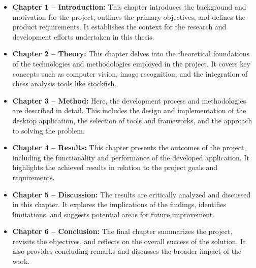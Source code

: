 \begin{itemize}
    \item \textbf{Chapter 1 -- Introduction:} This chapter introduces the background and motivation for the project, outlines the primary objectives, and defines the product requirements. It establishes the context for the research and development efforts undertaken in this thesis.
    
    \item \textbf{Chapter 2 -- Theory:} This chapter delves into the theoretical foundations of the technologies and methodologies employed in the project. It covers key concepts such as computer vision, image recognition, and the integration of chess analysis tools like \gls{stockfish}.
    
    \item \textbf{Chapter 3 -- Method:} Here, the development process and methodologies are described in detail. This includes the design and implementation of the desktop application, the selection of tools and frameworks, and the approach to solving the problem.
    
    \item \textbf{Chapter 4 -- Results:} This chapter presents the outcomes of the project, including the functionality and performance of the developed application. It highlights the achieved results in relation to the project goals and requirements.
    
    \item \textbf{Chapter 5 -- Discussion:} The results are critically analyzed and discussed in this chapter. It explores the implications of the findings, identifies limitations, and suggests potential areas for future improvement.
    
    \item \textbf{Chapter 6 -- Conclusion:} The final chapter summarizes the project, revisits the objectives, and reflects on the overall success of the solution. It also provides concluding remarks and discusses the broader impact of the work.
\end{itemize}






%     

